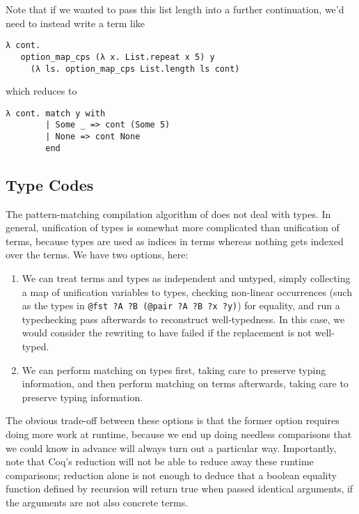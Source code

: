 Note that if we wanted to pass this list length into a further continuation, we'd need to instead write a term like
\begin{verbatim}
λ cont.
   option_map_cps (λ x. List.repeat x 5) y
     (λ ls. option_map_cps List.length ls cont)
\end{verbatim}
\noindent
which reduces to
\begin{verbatim}
λ cont. match y with
        | Some _ => cont (Some 5)
        | None => cont None
        end
\end{verbatim}

\subsection{Type Codes}\label{sec:rewriting-more:pre-reduction:type-codes}
The pattern-matching compilation algorithm of \textcite{Aehlig} does not deal with types.
In general, unification of types is somewhat more complicated than unification of terms, because types are used as indices in terms whereas nothing gets indexed over the terms.
We have two options, here:
\begin{enumerate}
\item
  We can treat terms and types as independent and untyped, simply collecting a map of unification variables to types, checking non-linear occurrences (such as the types in \texttt{@fst ?A ?B (@pair ?A ?B ?x ?y)}) for equality, and run a typechecking pass afterwards to reconstruct well-typedness.
  In this case, we would consider the rewriting to have failed if the replacement is not well-typed.
\item
  We can perform matching on types first, taking care to preserve typing information, and then perform matching on terms afterwards, taking care to preserve typing information.
\end{enumerate}

The obvious trade-off between these options is that the former option requires doing more work at runtime, because we end up doing needless comparisons that we could know in advance will always turn out a particular way.
Importantly, note that Coq's reduction will not be able to reduce away these runtime comparisons; reduction alone is not enough to deduce that a boolean equality function defined by recursion will return true when passed identical arguments, if the arguments are not also concrete terms.
%
%

